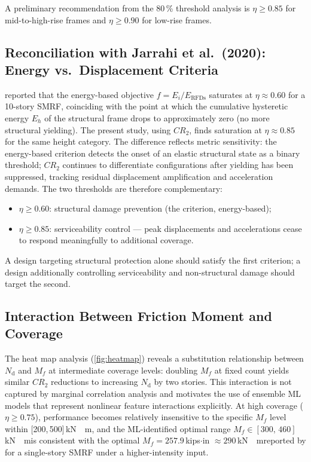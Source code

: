 \documentclass[preprint,12pt,authoryear]{elsarticle}
\newcommand{\nd}{N_{\mathrm{d}}}               %
\newcommand{\etad}{\eta}                        %
\newcommand{\Mf}{M_{\!f}}                      %
\newcommand{\KM}{\,\si{kN{\cdot}m}}
\begin{document}
A preliminary recommendation from the 80\,\% threshold analysis is
$\etad \geq 0.85$ for mid-to-high-rise frames and $\etad \geq 0.90$ for
low-rise frames.

\subsection{Reconciliation with Jarrahi et al.\ (2020): Energy vs.\ Displacement Criteria}

\citet{Jarrahi2020sdee} reported that the energy-based objective
$f = E_i / E_{\mathrm{RFDs}}$ saturates at $\etad \approx 0.60$ for a
10-story SMRF, coinciding with the point at which the cumulative hysteretic
energy $E_h$ of the structural frame drops to approximately zero (no more
structural yielding). The present study, using $CR_2$, finds saturation at
$\etad \approx 0.85$ for the same height category. The difference reflects
metric sensitivity: the energy-based criterion detects the onset of an elastic
structural state as a binary threshold; $CR_2$ continues to differentiate
configurations after yielding has been suppressed, tracking residual
displacement amplification and acceleration demands. The two thresholds are
therefore complementary:
\begin{itemize}
    \item $\etad \geq 0.60$: structural damage prevention (the
          \citealt{Jarrahi2020sdee} criterion, energy-based);
    \item $\etad \geq 0.85$: serviceability control --- peak displacements
          and accelerations cease to respond meaningfully to additional coverage.
\end{itemize}
A design targeting structural protection alone should satisfy the first
criterion; a design additionally controlling serviceability and non-structural
damage should target the second.

\subsection{Interaction Between Friction Moment and Coverage}

The heat map analysis (\cref{fig:heatmap}) reveals a substitution relationship
between $\nd$ and $\Mf$ at intermediate coverage levels: doubling $\Mf$ at
fixed count yields similar $CR_2$ reductions to increasing $\nd$ by two stories.
This interaction is not captured by marginal correlation analysis and motivates
the use of ensemble ML models that represent nonlinear feature interactions
explicitly. At high coverage ($\etad \geq 0.75$), performance becomes relatively
insensitive to the specific $\Mf$ level within [200,\,500]\KM, and the
ML-identified optimal range $\Mf \in [300,\,460]$\KM is consistent with the
optimal $\Mf = 257.9$\,kips$\cdot$in $\approx 290$\KM reported by
\citet{Jarrahi2020jbe} for a single-story SMRF under a higher-intensity input.
\end{document}
